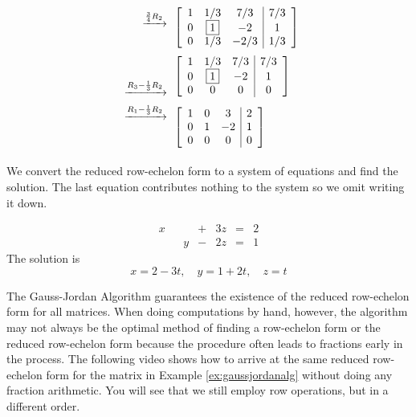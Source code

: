 \documentclass{ximera}
\begin{document}
\begin{example}
\begin{explanation}
\begin{align*}
\begin{array}{c}
 \xrightarrow{\frac{3}{4}R_2}\\
\\
\end{array}
&\left[\begin{array}{ccc|c}  
 1&1/3&7/3&7/3\\0&\fbox{$1$}&-2&1\\0&1/3&-2/3&1/3
 \end{array}\right]\\
 \begin{array}{c}
\\
\\
 \xrightarrow{R_3-\frac{1}{3}R_2}\\
\end{array}
&\left[\begin{array}{ccc|c}  
 1&1/3&7/3&7/3\\0&\fbox{$1$}&-2&1\\0&0&0&0
 \end{array}\right]\\
 \begin{array}{c}
 \xrightarrow{R_1-\frac{1}{3}R_2}\\
 \\
\\
\end{array}
&\left[\begin{array}{ccc|c}  
 1&0&3&2\\0&1&-2&1\\0&0&0&0
 \end{array}\right]
 \end{align*}
 
 We convert the reduced row-echelon form to a system of equations and find the solution.  The last equation contributes nothing to the system so we omit writing it down.
 
 $$\begin{array}{ccccccccc}
      x & &&+&3z&= &2 \\
	 & &y&-&2z&=&1
    \end{array}$$
    The solution is
    $$x=2-3t,\quad y=1+2t,\quad z=t$$
\end{explanation}
\end{example}
The Gauss-Jordan Algorithm guarantees the existence of the reduced row-echelon form for all matrices.  
When doing computations by hand, however, the algorithm may not always be the optimal method of finding a row-echelon form or the reduced row-echelon form because the procedure often leads to fractions early in the process. 
The following video shows how to arrive at the same reduced row-echelon form for the matrix in Example \ref{ex:gaussjordanalg} without doing any fraction arithmetic.  You will see that we still employ row operations, but in a different order.
\end{document}
